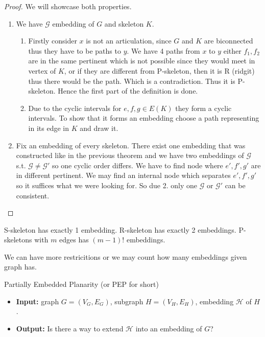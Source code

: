 \begin{proof}
	We will showcase both properties.
	
	\begin{enumerate}
		\item We have $\mathcal{G}$ embedding of $G$ and skeleton $K$.
		
		\begin{enumerate}
			\item Firstly consider $x$ is not an articulation, since $G$ and $K$ are biconnected thus they have to be paths to $y$. We have 4 paths from $x$ to $y$ either $f_1, f_2$ are in the same pertinent which is not possible since they would meet in vertex of $K$, or if they are different from P-skeleton, then it is R (ridgit) thus there would be the path. Which is a contradiction. Thus it is P-skeleton. Hence the first part of the definition is done.
			
			\item Due to the cyclic intervals for $e,f,g \in E(K)$ they form a cyclic intervals. To show that it forms an embedding choose a path representing in its edge in $K$ and draw it.
		\end{enumerate}
	
		\item Fix an embedding of every skeleton. There exist one embedding that was constructed like in the previous theorem and we have two embeddings of $\mathcal{G}$ s.t. $\mathcal{G} \neq \mathcal{G}'$ so one cyclic order differs. We have to find node where $e',f',g'$ are in different pertinent. We may find an internal node which separates $e',f',g'$ so it suffices what we were looking for. So due 2. only one $\mathcal{G}$ or $\mathcal{G}'$ can be consistent.
	\end{enumerate}
\end{proof}

\begin{note}
	S-skeleton has exactly 1 embedding. R-skeleton has exactly 2 embeddings. P-skeletons with $m$ edges has $(m-1)!$ embeddings.
\end{note}

\noindent We can have more restricitions or we may count how many embeddings given graph has.

\begin{mybox}{Partially Embedded Planarity (or PEP for short)}
	\begin{itemize} []
		\item \textbf{Input:} graph $G = (V_G, E_G)$, subgraph $H = (V_H, E_H)$, embedding $\mathcal{H}$ of $H$.
		\item \textbf{Output:} Is there a way to extend $\mathcal{H}$ into an embedding of $G$?
	\end{itemize}
\end{mybox}

